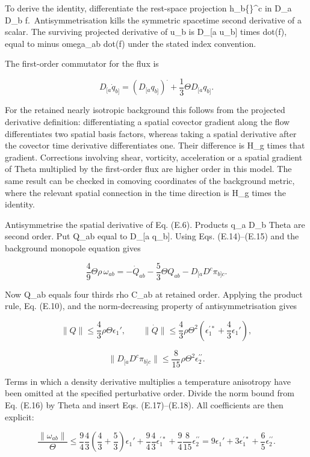 \documentclass[
  11pt,
  a4paper]{article}
\begin{document}
To derive the identity, differentiate the rest-space projection h\_b\{\}\^{}c in D\_a D\_b f.~Antisymmetrisation kills the symmetric spacetime second derivative of a scalar. The surviving projected derivative of u\_b is D\_{[}a u\_b{]} times dot(f), equal to minus omega\_ab dot(f) under the stated index convention.

The first-order commutator for the flux is

\[
D_{[a}\dot q_{b]}=(D_{[a}q_{b]})^{\displaystyle\cdot}
+\frac13\Theta D_{[a}q_{b]}.
\tag{E.15}
\]

For the retained nearly isotropic background this follows from the projected derivative definition: differentiating a spatial covector gradient along the flow differentiates two spatial basis factors, whereas taking a spatial derivative after the covector time derivative differentiates one. Their difference is H\_g times that gradient. Corrections involving shear, vorticity, acceleration or a spatial gradient of Theta multiplied by the first-order flux are higher order in this model. The same result can be checked in comoving coordinates of the background metric, where the relevant spatial connection in the time direction is H\_g times the identity.

Antisymmetrise the spatial derivative of Eq. (E.6). Products q\_a D\_b Theta are second order. Put Q\_ab equal to D\_{[}a q\_b{]}. Using Eqs. (E.14)--(E.15) and the background monopole equation gives

\[
\frac49\Theta\rho\,\omega_{ab}
=-\dot Q_{ab}-\frac53\Theta Q_{ab}
-D_{[a}D^c\pi_{b]c}.
\tag{E.16}
\]

Now Q\_ab equals four thirds rho C\_ab at retained order. Applying the product rule, Eq. (E.10), and the norm-decreasing property of antisymmetrisation gives

\[
\|Q\|\le\frac43\rho\Theta\epsilon_1',
\qquad
\|\dot Q\|\le\frac43\rho\Theta^2
\left(\epsilon_1^{\prime *}+\frac43\epsilon_1'\right),
\tag{E.17}
\]

\[
\|D_{[a}D^c\pi_{b]c}\|
\le\frac8{15}\rho\Theta^2\epsilon_2^{\prime\prime}.
\tag{E.18}
\]

Terms in which a density derivative multiplies a temperature anisotropy have been omitted at the specified perturbative order. Divide the norm bound from Eq. (E.16) by Theta and insert Eqs. (E.17)--(E.18). All coefficients are then explicit:

\[
\frac{\|\omega_{ab}\|}{\Theta}
\le
\frac94\frac43\left(\frac43+\frac53\right)\epsilon_1'
+\frac94\frac43\epsilon_1^{\prime *}
+\frac94\frac8{15}\epsilon_2^{\prime\prime}
=9\epsilon_1'+3\epsilon_1^{\prime *}
+\frac65\epsilon_2^{\prime\prime}.
\tag{E.19}
\]
\end{document}
